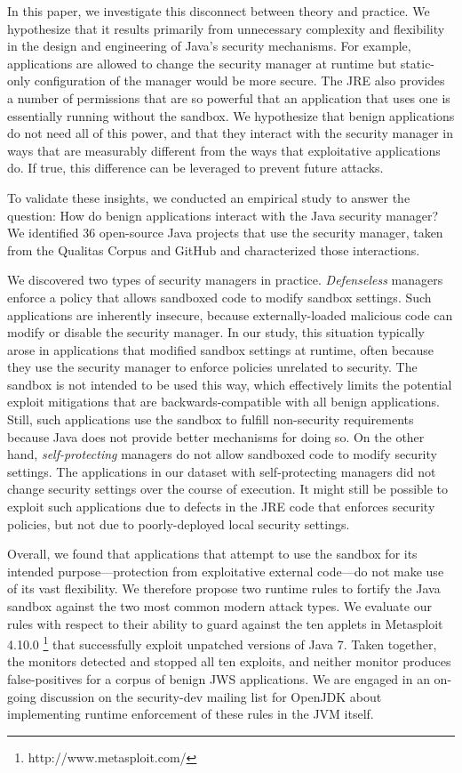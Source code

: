 \documentclass{sig-alternate}
\begin{document}
In this paper, we investigate this disconnect between theory and practice.  We
hypothesize that it results primarily from unnecessary complexity and flexibility
in the design and engineering of Java's security mechanisms.  For example,
applications are allowed to change the security manager at runtime but
static-only configuration of the manager would be more secure. The JRE also
provides a number of permissions that are so powerful that an application
that uses one is essentially running without the sandbox. We 
hypothesize that benign applications do not need all of this power, and that
they interact with the security manager in ways
that are measurably different from the ways that exploitative applications do.  
If true, this difference can be leveraged to prevent future attacks.

To validate these insights, we conducted an empirical study
to answer the question: How do benign
applications interact with the Java security manager?  We identified 36
open-source Java projects that use the security manager, taken from the Qualitas
Corpus \cite{QualitasCorpus:APSEC:2010} and GitHub and characterized
those interactions.

We discovered two types of security managers in
practice. \emph{Defenseless} managers enforce a policy that allows sandboxed code
to modify sandbox settings.  Such applications
are inherently insecure, because externally-loaded malicious code can
modify or disable the security manager.  In our study, this situation typically
arose in applications that modified sandbox settings at runtime, often because
they use the security manager to enforce policies unrelated to security.
The sandbox is not intended to be used this way, 
which effectively limits the potential exploit mitigations that are
backwards-compatible with all benign applications. Still, such applications use the
sandbox to fulfill non-security requirements
because Java does not provide better mechanisms for doing so.  
On the other hand, \emph{self-protecting} managers do not allow sandboxed code to modify
security settings.  The applications in our dataset with self-protecting
managers did not change security 
settings over the course of execution.  It might still be possible to exploit
such applications due to defects in the JRE code that enforces security
policies, but not due to poorly-deployed local security settings.

Overall, we found that applications that attempt to use the sandbox for its intended
purpose---protection from exploitative external code---do not make use of its
vast flexibility.  We therefore propose two runtime rules to fortify the Java
sandbox against the two most common modern attack types. We evaluate our rules
with respect to their ability to guard against the ten applets in Metasploit
4.10.0%
\footnote{http://www.metasploit.com/%
} that successfully exploit unpatched versions of Java 7. Taken together, the
monitors detected and stopped all ten exploits, and neither monitor produces
false-positives for a corpus of benign JWS applications.
We are engaged in an
on-going discussion on the security-dev mailing list for OpenJDK about
implementing runtime enforcement of these rules in the JVM itself.
\end{document}
